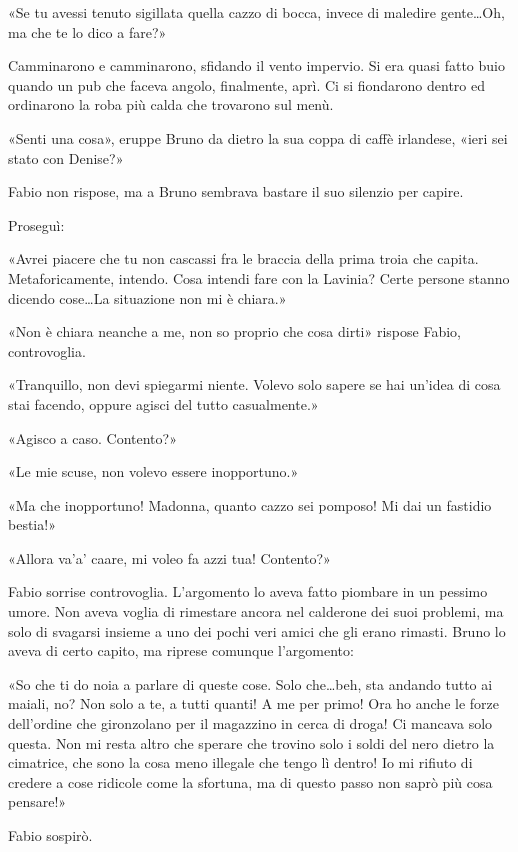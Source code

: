 «Se tu avessi tenuto sigillata quella cazzo di bocca, invece di maledire gente\ldots Oh, ma che te lo dico a fare?»

Camminarono e camminarono, sfidando il vento impervio. Si era quasi fatto buio quando un pub che faceva angolo, finalmente, aprì. Ci si fiondarono dentro ed ordinarono la roba più calda che trovarono sul menù.

«Senti una cosa», eruppe Bruno da dietro la sua coppa di caffè irlandese, «ieri sei stato con Denise?»

Fabio non rispose, ma a Bruno sembrava bastare il suo silenzio per capire.

Proseguì:

«Avrei piacere che tu non cascassi fra le braccia della prima troia che capita. Metaforicamente, intendo. Cosa intendi fare con la Lavinia? Certe persone stanno dicendo cose\ldots La situazione non mi è chiara.»

«Non è chiara neanche a me, non so proprio che cosa dirti» rispose Fabio, controvoglia.

«Tranquillo, non devi spiegarmi niente. Volevo solo sapere se hai un'idea di cosa stai facendo, oppure agisci del tutto casualmente.»

«Agisco a caso. Contento?»

«Le mie scuse, non volevo essere inopportuno.»

«Ma che inopportuno! Madonna, quanto cazzo sei pomposo! Mi dai un fastidio bestia!»

«Allora va'a' caare, mi voleo fa \textsc{}azzi tua! Contento?»

Fabio sorrise controvoglia. L'argomento lo aveva fatto piombare in un pessimo umore. Non aveva voglia di rimestare ancora nel calderone dei suoi problemi, ma solo di svagarsi insieme a uno dei pochi veri amici che gli erano rimasti. Bruno lo aveva di certo capito, ma riprese comunque l'argomento:

«So che ti do noia a parlare di queste cose. Solo che\ldots beh, sta andando tutto ai maiali, no? Non solo a te, a tutti quanti! A me per primo! Ora ho anche le forze dell'ordine che gironzolano per il magazzino in cerca di droga! Ci mancava solo questa. Non mi resta altro che sperare che trovino solo i soldi del nero dietro la cimatrice, che sono la cosa meno illegale che tengo lì dentro! Io mi rifiuto di credere a cose ridicole come la sfortuna, ma di questo passo non saprò più cosa pensare!»

Fabio sospirò.

